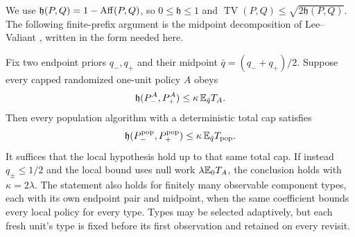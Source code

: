 We use $\mathfrak h(P,Q)=1-\operatorname{Aff}(P,Q)$, so $0\le\mathfrak h\le1$ and
$\operatorname{TV}(P,Q)\le\sqrt{2\mathfrak h(P,Q)}$.
The following finite-prefix argument is the midpoint decomposition of
Lee--Valiant \cite[Lemma 17]{lv}, written in the form needed here.

\begin{lemma}\label{lem:tf-midpoint}
Fix two endpoint priors $q_-,q_+$ and their midpoint
$\bar q=(q_-+q_+)/2$. Suppose every capped randomized one-unit policy
$A$ obeys
\[
 \mathfrak h(P_-^A,P_+^A)\le\kappa\,\mathbb E_{\bar q}T_A.
\]
Then every population algorithm with a deterministic total cap satisfies
\[
 \mathfrak h(P_-^{\rm pop},P_+^{\rm pop})
 \le\kappa\,\mathbb E_{\bar q}T_{\rm pop}.
\]
It suffices that the local hypothesis hold up to that same total cap.
If instead $q_\pm\le1/2$ and the local bound uses null work
$\lambda\mathbb E_0T_A$, the conclusion holds with $\kappa=2\lambda$.
The statement also holds for finitely many observable component types,
each with its own endpoint pair and midpoint, when the same coefficient
bounds every local policy for every type. Types may be selected adaptively, but each fresh unit's type is fixed
before its first observation and retained on every revisit.
\end{lemma}

